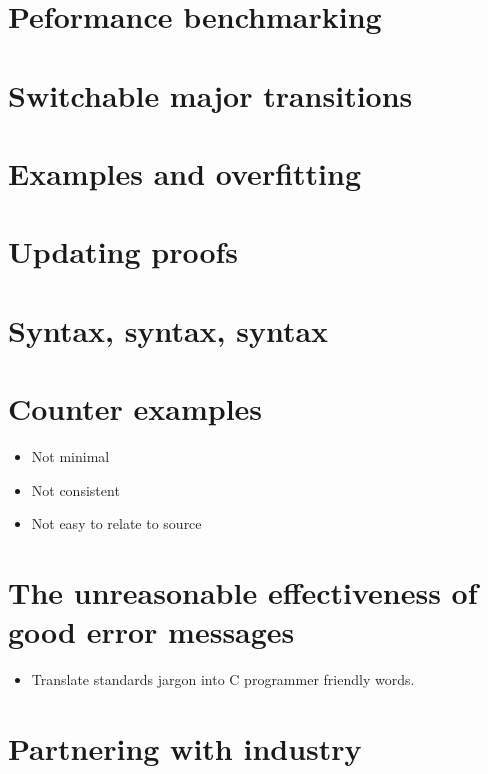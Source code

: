 \section{Peformance benchmarking}

\section{Switchable major transitions}

\section{Examples and overfitting}

\section{Updating proofs}

\section{Syntax, syntax, syntax}

\section{Counter examples}\label{sec:counter-ex}

\begin{itemize}
    \item Not minimal
    \item Not consistent
    \item Not easy to relate to source
\end{itemize}

\section{The unreasonable effectiveness of good error messages}\label{sec:error-msgs}

\begin{itemize}
    \item Translate standards jargon into C programmer friendly words.
\end{itemize}

\section{Partnering with industry}

